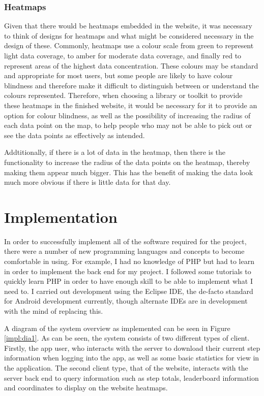 \documentclass{l4proj}
\begin{document}
\subsection{Heatmaps}

Given that there would be heatmaps embedded in the website, it was necessary to think of designs for heatmaps and what might be considered necessary in the design of these. Commonly, heatmaps use a colour scale from green to represent light data coverage, to amber for moderate data coverage, and finally red to represent areas of the highest data concentration. These colours may be standard and appropriate for most users, but some people are likely to have colour blindness and therefore make it difficult to distinguish between or understand the colours represented. Therefore, when choosing a library or toolkit to provide these heatmaps in the finished website, it would be necessary for it to provide an option for colour blindness, as well as the possibility of increasing the radius of each data point on the map, to help people who may not be able to pick out or see the data points as effectively as intended. 

Addtitionally, if there is a lot of data in the heatmap, then there is the functionality to increase the radius of the data points on the heatmap, thereby making them appear much bigger. This has the benefit of making the data look much more obvious if there is little data for that day. 


\chapter{Implementation}

In order to successfully implement all of the software required for the project, there were a number of new programming languages and concepts to become comfortable in using. For example, I had no knowledge of PHP but had to learn in order to implement the back end for my project. I followed some tutorials to quickly learn PHP in order to have enough skill to be able to implement what I need to. I carried out development using the Eclipse IDE, the de-facto standard for Android development currently, though alternate IDEs are in development with the mind of replacing this. 

A diagram of the system overview as implemented can be seen in Figure \ref{impl:dia1}. As can be seen, the system consists of two different types of client. Firstly, the app user, who interacts with the server to download their current step information when logging into the app, as well as some basic statistics for view in the application. The second client type, that of the website, interacts with the server back end to query information such as step totals, leaderboard information and coordinates to display on the website heatmaps.
\end{document}
